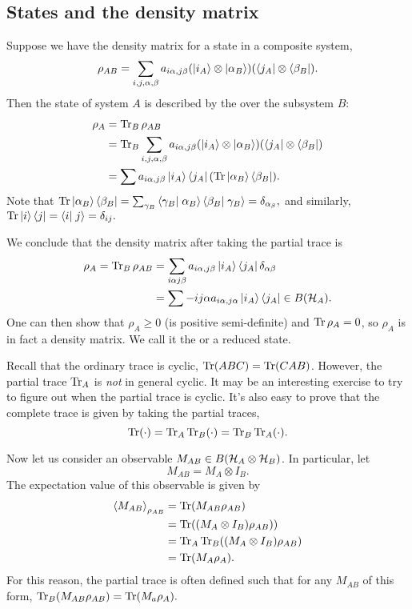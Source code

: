 \subsection*{States and the density matrix}
Suppose we have the density matrix for a state in a composite system,
\begin{equation}
    \rho_{AB}=\sum_{i,j,\alpha,\beta} a_{i\alpha,j\beta}(\left| i_A \right>\otimes \left| \alpha_B \right>)(\left< j_A \right|\otimes \left< \beta_B \right|).
\end{equation}
Then the state of system $A$ is described by the  over the subsystem $B$:
\begin{align}
    \rho_A &= \operatorname{Tr}_B \rho_{AB}\\
    &=\operatorname{Tr}_B \sum_{i,j,\alpha,\beta} a_{i\alpha,j\beta}(\left| i_A \right>\otimes \left| \alpha_B \right>)(\left< j_A \right|\otimes \left< \beta_B \right|)\\
    &= \sum a_{i\alpha,j\beta}\left| i_A \right>\left< j_A \right| (\operatorname{Tr}\left| \alpha_B \right>\left< \beta_B \right|).
\end{align}
Note that $\Tr \ket{\alpha_B}\bra{\beta_B}=\sum_{\gamma_B} \braket{\gamma_B}{\alpha_B}\braket{\beta_B}{\gamma_B}=\delta_{\alpha_\beta},$ and similarly, $\Tr\ket{i}\bra{j}=\braket{i}{j}=\delta_{ij}.$

We conclude that the density matrix after taking the partial trace is
\begin{align}
    \rho_A =\operatorname{Tr}_B \rho_{AB} &= \sum_{i\alpha j\beta} a_{i\alpha,j\beta}\left| i_A \right>\left< j_A \right|\delta_{\alpha\beta}\\
    &=\sum-{ij\alpha} a_{i\alpha,j\alpha} \left| i_A \right>\left< j_A \right| \in B(\mathcal H_A).
\end{align}
One can then show that $\rho_A \geq 0$ (is positive semi-definite) and $\operatorname{Tr} \rho_A=0$, so $\rho_A$ is in fact a density matrix. We call it the  or a reduced state.

Recall that the ordinary trace is cyclic, $\operatorname{Tr}(ABC)=\operatorname{Tr}(CAB)$. However, the partial trace $\operatorname{Tr}_A$ is \emph{not} in  general cyclic. It may be an interesting exercise to try to figure out when the partial trace is cyclic. It's also easy to prove that the complete trace is given by taking the partial traces,
\begin{equation}
    \operatorname{Tr}(\cdot)=\operatorname{Tr}_A \operatorname{Tr}_B(\cdot) = \operatorname{Tr}_B \operatorname{Tr}_A(\cdot).
\end{equation}

Now let us consider an observable $M_{AB} \in B(\mathcal H_A \otimes \mathcal H_B)$. In particular, let
\begin{equation}
    M_{AB}=M_A \otimes I_B.
\end{equation}
The expectation value of this observable is given by
\begin{align*}
    \left< M_{AB} \right>_{\rho_{AB}} &= \operatorname{Tr} (M_{AB} \rho_{AB})\\
    &= \operatorname{Tr}((M_A\otimes I_B) \rho_{AB}))\\
    &= \operatorname{Tr}_A \operatorname{Tr}_B ((M_A \otimes I_B)\rho_{AB})\\
    &= \operatorname{Tr}(M_A \rho_A).
\end{align*}
For this reason, the partial trace is often defined such that for any $M_{AB}$ of this form, $\operatorname{Tr}_B(M_{AB}\rho_{AB})=\operatorname{Tr}(M_a \rho_A).$

